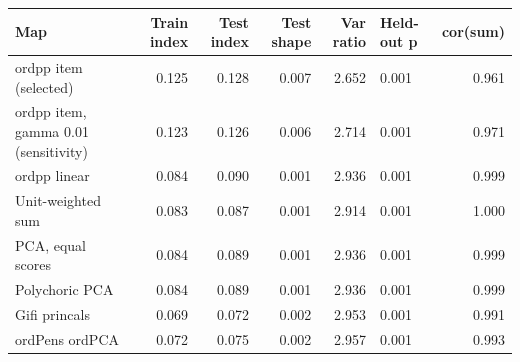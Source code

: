 \begin{tabular}{lrrrrlr}
\toprule
Map & Train index & Test index & Test shape & Var ratio & Held-out p & cor(sum) \\
\midrule
ordpp item (selected) & 0.125 & 0.128 & 0.007 & 2.652 & 0.001 & 0.961 \\
ordpp item, gamma 0.01 (sensitivity) & 0.123 & 0.126 & 0.006 & 2.714 & 0.001 & 0.971 \\
ordpp linear & 0.084 & 0.090 & 0.001 & 2.936 & 0.001 & 0.999 \\
Unit-weighted sum & 0.083 & 0.087 & 0.001 & 2.914 & 0.001 & 1.000 \\
PCA, equal scores & 0.084 & 0.089 & 0.001 & 2.936 & 0.001 & 0.999 \\
Polychoric PCA & 0.084 & 0.089 & 0.001 & 2.936 & 0.001 & 0.999 \\
Gifi princals & 0.069 & 0.072 & 0.002 & 2.953 & 0.001 & 0.991 \\
ordPens ordPCA & 0.072 & 0.075 & 0.002 & 2.957 & 0.001 & 0.993 \\
\bottomrule
\end{tabular}

